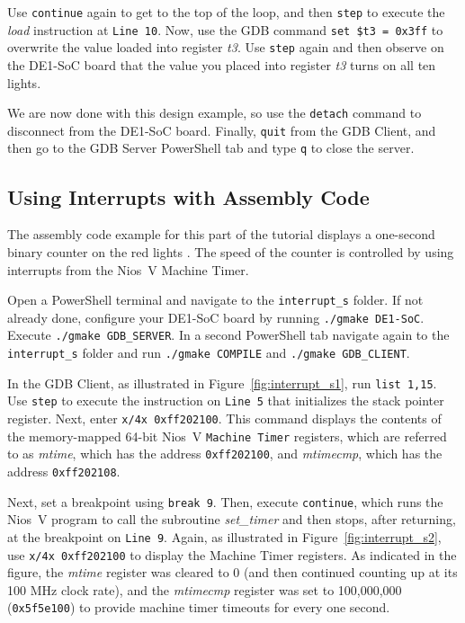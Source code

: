 \documentclass[11pt, twoside, pdftex]{article}
\newcommand{\red}[1]{{\color{red}\sf{#1}}}
\begin{document}
Use \texttt{continue} again to get to the top of the loop, and then \texttt{step} to
execute the {\it load} instruction at \texttt{Line 10}. Now, use the GDB command 
\texttt{set \$t3 = 0x3ff} to overwrite the value loaded into register {\it t3}. Use
\texttt{step} again and then observe on the DE1-SoC board that the value you placed 
into register {\it t3} turns on all ten \red{{\it LEDR}} lights. 

We are now done with this design example, so use the \texttt{detach} command to disconnect
from the DE1-SoC board. Finally, \texttt{quit} from the GDB Client, and then go to the
GDB Server PowerShell tab and type \texttt{q} to close the server.

\subsection{Using Interrupts with Assembly Code}

The assembly code example for this part of the tutorial displays a one-second binary counter on 
the red lights \red{{\it LEDR}}. The speed of the counter is controlled by using interrupts from 
the Nios~V Machine Timer.  

Open a PowerShell terminal and navigate to the \texttt{interrupt\_s} folder.
If not already done, configure your DE1-SoC board by running \texttt{./gmake DE1-SoC}. Execute 
\texttt{./gmake GDB\_SERVER}. In a second PowerShell tab navigate again to the 
\texttt{interrupt\_s} folder and run \texttt{./gmake COMPILE} and \texttt{./gmake GDB\_CLIENT}.

In the GDB Client, as illustrated in Figure~\ref{fig:interrupt_s1}, run \texttt{list 1,15}. 
Use \texttt{step} to execute the instruction on \texttt{Line 5} that initializes the stack pointer
register. Next, enter \texttt{x/4x 0xff202100}. This command displays the contents 
of the memory-mapped 64-bit Nios~V \texttt{Machine Timer} registers, which are referred to as 
{\it mtime}, which has the address \texttt{0xff202100}, and {\it mtimecmp}, which has the
address \texttt{0xff202108}.

Next, set a breakpoint using \texttt{break 9}. Then, execute \texttt{continue}, which runs the
Nios~V program to call the subroutine {\it set\_timer} and then stops, after returning, at 
the breakpoint on \texttt{Line 9}. Again, as illustrated in Figure~\ref{fig:interrupt_s2}, use 
\texttt{x/4x~0xff202100} to display the Machine Timer registers. As indicated in the figure, 
the {\it mtime} register was cleared to 0 (and then continued counting up at its 100 MHz clock 
rate), and the {\it mtimecmp} register was set to 100,000,000 (\texttt{0x5f5e100}) to
provide machine timer timeouts for every one second.  
\end{document}
